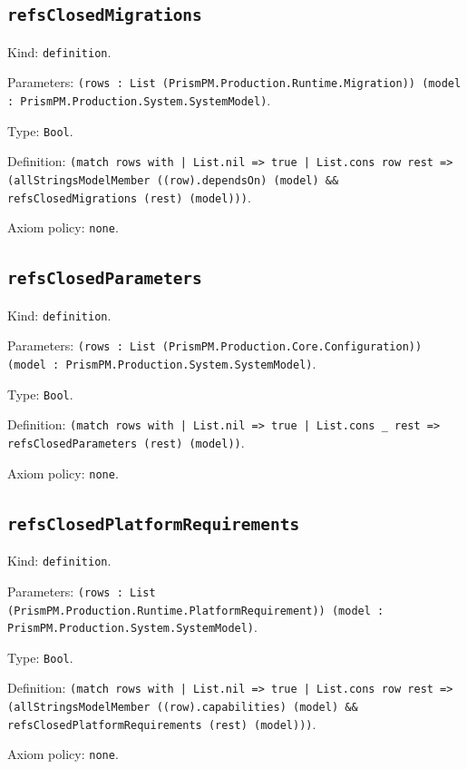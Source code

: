 \documentclass[11pt]{article}
\begin{document}
\subsection*{\texttt{refsClosedMigrations}}
\noindent Kind: \texttt{definition}.\par
\noindent Parameters: \texttt{(rows : List (PrismPM.Production.Runtime.Migration)) (model : PrismPM.Production.System.SystemModel)}.\par
\noindent Type: \texttt{Bool}.\par
\noindent Definition: \texttt{(match rows with | List.nil => true | List.cons row rest => (allStringsModelMember ((row).dependsOn) (model) \&\& refsClosedMigrations (rest) (model)))}.\par
\noindent Axiom policy: \texttt{none}.\par
\subsection*{\texttt{refsClosedParameters}}
\noindent Kind: \texttt{definition}.\par
\noindent Parameters: \texttt{(rows : List (PrismPM.Production.Core.Configuration)) (model : PrismPM.Production.System.SystemModel)}.\par
\noindent Type: \texttt{Bool}.\par
\noindent Definition: \texttt{(match rows with | List.nil => true | List.cons \_ rest => refsClosedParameters (rest) (model))}.\par
\noindent Axiom policy: \texttt{none}.\par
\subsection*{\texttt{refsClosedPlatformRequirements}}
\noindent Kind: \texttt{definition}.\par
\noindent Parameters: \texttt{(rows : List (PrismPM.Production.Runtime.PlatformRequirement)) (model : PrismPM.Production.System.SystemModel)}.\par
\noindent Type: \texttt{Bool}.\par
\noindent Definition: \texttt{(match rows with | List.nil => true | List.cons row rest => (allStringsModelMember ((row).capabilities) (model) \&\& refsClosedPlatformRequirements (rest) (model)))}.\par
\noindent Axiom policy: \texttt{none}.\par
\end{document}
